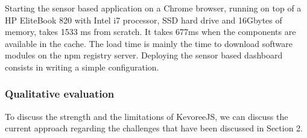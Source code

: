 Starting the sensor based application on a Chrome browser, running on top of a HP EliteBook 820 with Intel i7 processor, SSD hard drive and 16Gbytes of memory, takes 1533 ms from scratch. It takes 677ms when the components are available in the cache. The load time is mainly the time to download software modules on the npm registry server. Deploying the sensor based dashboard consists in writing a simple configuration.    


\subsubsection{Qualitative evaluation  }
To discuss the strength and the limitations of KevoreeJS, we can discuss the current approach regarding the challenges that have been discussed in Section 2.   

